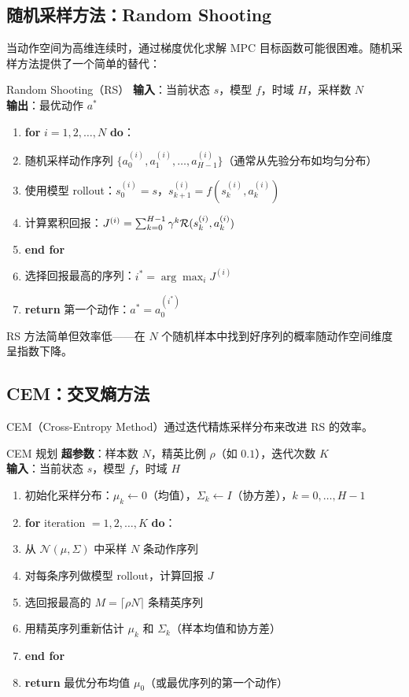 \subsection{随机采样方法：Random Shooting}

当动作空间为高维连续时，通过梯度优化求解 MPC 目标函数可能很困难。随机采样方法提供了一个简单的替代：

\begin{myalgorithm}{Random Shooting（RS）}
\textbf{输入}：当前状态 $s$，模型 $f$，时域 $H$，采样数 $N$\\
\textbf{输出}：最优动作 $a^*$
\begin{enumerate}
    \item \textbf{for} $i = 1, 2, \dots, N$ \textbf{do}：
    \item \quad 随机采样动作序列 $\{a_0^{(i)}, a_1^{(i)}, \dots, a_{H-1}^{(i)}\}$（通常从先验分布如均匀分布）
    \item \quad 使用模型 rollout：$s_0^{(i)} = s$，$s_{k+1}^{(i)} = f(s_k^{(i)}, a_k^{(i)})$
    \item \quad 计算累积回报：$J^{(i)} = \sum_{k=0}^{H-1} \gamma^k \mathcal{R}(s_k^{(i)}, a_k^{(i)})$
    \item \textbf{end for}
    \item 选择回报最高的序列：$i^* = \arg\max_i J^{(i)}$
    \item \textbf{return} 第一个动作：$a^* = a_0^{(i^*)}$
\end{enumerate}
\end{myalgorithm}

RS 方法简单但效率低——在 $N$ 个随机样本中找到好序列的概率随动作空间维度呈指数下降。

\subsection{CEM：交叉熵方法}

CEM（Cross-Entropy Method）通过迭代精炼采样分布来改进 RS 的效率。

\begin{myalgorithm}{CEM 规划}
\textbf{超参数}：样本数 $N$，精英比例 $\rho$（如 $0.1$），迭代次数 $K$\\
\textbf{输入}：当前状态 $s$，模型 $f$，时域 $H$
\begin{enumerate}
    \item 初始化采样分布：$\mu_k \leftarrow 0$（均值），$\Sigma_k \leftarrow I$（协方差），$k = 0, \dots, H-1$
    \item \textbf{for} iteration $= 1, 2, \dots, K$ \textbf{do}：
    \item \quad 从 $\mathcal{N}(\mu, \Sigma)$ 中采样 $N$ 条动作序列
    \item \quad 对每条序列做模型 rollout，计算回报 $J$
    \item \quad 选回报最高的 $M = \lceil \rho N \rceil$ 条精英序列
    \item \quad 用精英序列重新估计 $\mu_k$ 和 $\Sigma_k$（样本均值和协方差）
    \item \textbf{end for}
    \item \textbf{return} 最优分布均值 $\mu_0$（或最优序列的第一个动作）
\end{enumerate}
\end{myalgorithm}


